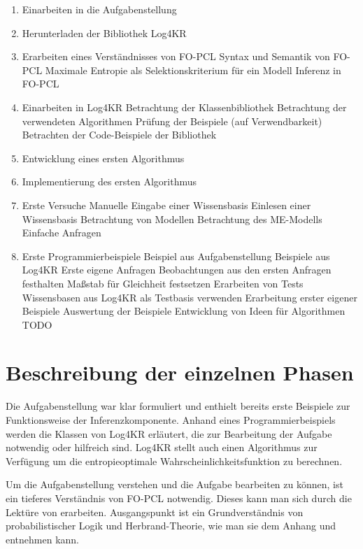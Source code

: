 \documentclass[a4paper, 11pt]{book}
\begin{document}
\begin{enumerate}
	\item Einarbeiten in die Aufgabenstellung
	\item Herunterladen der Bibliothek Log4KR
	\item Erarbeiten eines Verständnisses von FO-PCL
	\subitem Syntax und Semantik von FO-PCL
	\subitem Maximale Entropie als Selektionskriterium für ein Modell
	\subitem Inferenz in FO-PCL
	\item Einarbeiten in Log4KR
	\subitem Betrachtung der Klassenbibliothek 
	\subitem Betrachtung der verwendeten Algorithmen
	\subitem Prüfung der Beispiele (auf Verwendbarkeit)
	\subitem Betrachten der Code-Beispiele der Bibliothek
	\item Entwicklung eines ersten Algorithmus
	\item Implementierung des ersten Algorithmus
	\item Erste Versuche 
	\subitem Manuelle Eingabe einer Wissensbasis
	\subitem Einlesen einer Wissensbasis
	\subitem Betrachtung von Modellen
	\subitem Betrachtung des ME-Modells
	\subitem Einfache Anfragen
	\item Erste Programmierbeispiele
	\subitem Beispiel aus Aufgabenstellung
	\subitem Beispiele aus Log4KR
	\subitem Erste eigene Anfragen
	\subitem Beobachtungen aus den ersten Anfragen festhalten
	\subitem Maßstab für Gleichheit festsetzen 
	\subitem Erarbeiten von Tests
	\subitem Wissensbasen aus Log4KR als Testbasis verwenden
	\subitem Erarbeitung erster eigener Beispiele
	\subitem Auswertung der Beispiele
	\subitem Entwicklung von Ideen für Algorithmen
	TODO
	
\end{enumerate}

\section{Beschreibung der einzelnen Phasen}
Die Aufgabenstellung war klar formuliert und enthielt bereits erste Beispiele zur Funktionsweise der Inferenzkomponente. Anhand eines Programmierbeispiels werden die Klassen von Log4KR erläutert, die zur Bearbeitung der Aufgabe notwendig oder hilfreich sind. Log4KR stellt auch einen Algorithmus zur Verfügung um die entropieoptimale Wahrscheinlichkeitsfunktion zu berechnen.

Um die Aufgabenstellung verstehen und die Aufgabe bearbeiten zu können, ist ein tieferes Verständnis von FO-PCL notwendig. Dieses kann man sich durch die Lektüre von \cite{Fis10} erarbeiten. Ausgangspunkt ist ein Grundverständnis von probabilistischer Logik und Herbrand-Theorie, wie man sie dem Anhang und \cite{BK15} entnehmen kann.
\end{document}
